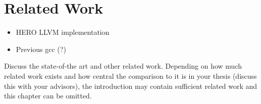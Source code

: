 \chapter{Related Work}
\label{ch:related_work}

\begin{itemize}
  \item HERO LLVM implementation
  \item Previous gcc (?)
\end{itemize}

{\color{red}
	Discuss the state-of-the art and other related work.
	Depending on how much related work exists and how central the comparison to it is in your thesis (discuss this with your advisors), the introduction may contain sufficient related work and this chapter can be omitted.
}
